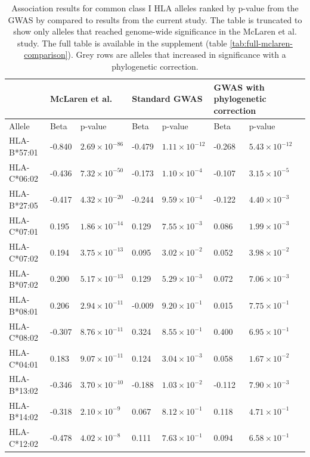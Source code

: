 \documentclass[]{article}
\begin{document}
\begin{doublespace}
\begin{table}[H]
	\begin{center}
	\begin{tabular} {p{3cm}p{1cm}p{2cm}p{1cm}p{2cm}p{1cm}p{2cm}} %
		\hline
		 & \multicolumn{2}{l}{McLaren et al.}  & \multicolumn{2}{l}{Standard GWAS } & \multicolumn{2}{l}{GWAS with phylogenetic correction} \\ 
		 \hline
		Allele & Beta & p-value & Beta & p-value & Beta & p-value \\
		\hline	
		HLA-B*57:01 & -0.840 & $2.69 \times 10^{-86}$ & -0.479 & $1.11 \times 10^{-12}$ & -0.268 & $5.43 \times 10^{-12}$ \\ 
		\rowcolor{Gray}
		HLA-C*06:02 & -0.436 & $7.32 \times 10^{-50}$ & -0.173 & $1.10 \times 10^{-4}$ & -0.107 & $3.15 \times 10^{-5}$ \\ 
		HLA-B*27:05 & -0.417 & $4.32 \times 10^{-20}$ & -0.244 & $9.59 \times 10^{-4}$ & -0.122 & $4.40 \times 10^{-3}$ \\ 
		\rowcolor{Gray}
		HLA-C*07:01 & 0.195 & $1.86 \times 10^{-14}$ & 0.129 & $7.55 \times 10^{-3}$ & 0.086 & $1.99 \times 10^{-3}$ \\ 
		HLA-C*07:02 & 0.194 & $3.75 \times 10^{-13}$ & 0.095 & $3.02 \times 10^{-2}$ & 0.052 & $3.98 \times 10^{-2}$ \\ 
		HLA-B*07:02 & 0.200 & $5.17 \times 10^{-13}$ & 0.129 & $5.29 \times 10^{-3}$ & 0.072 & $7.06 \times 10^{-3}$ \\ 
		\rowcolor{Gray}
		HLA-B*08:01 & 0.206 & $2.94 \times 10^{-11}$ & -0.009 & $9.20 \times 10^{-1}$ & 0.015 & $7.75 \times 10^{-1}$ \\ 
		\rowcolor{Gray}
		HLA-C*08:02 & -0.307 & $8.76 \times 10^{-11}$ & 0.324 & $8.55 \times 10^{-1}$ & 0.400 & $6.95 \times 10^{-1}$ \\ 
		HLA-C*04:01 & 0.183 & $9.07 \times 10^{-11}$ & 0.124 & $3.04 \times 10^{-3}$ & 0.058 & $1.67 \times 10^{-2}$ \\ 
		\rowcolor{Gray}
		HLA-B*13:02 & -0.346 & $3.70 \times 10^{-10}$ & -0.188 & $1.03 \times 10^{-2}$ & -0.112 & $7.90 \times 10^{-3}$ \\ 
		\rowcolor{Gray}
		HLA-B*14:02 & -0.318 & $2.10 \times 10^{-9}$ & 0.067 & $8.12 \times 10^{-1}$ & 0.118 & $4.71 \times 10^{-1}$ \\ 
		\rowcolor{Gray}
		HLA-C*12:02 & -0.478 & $4.02 \times 10^{-8}$ & 0.111 & $7.63 \times 10^{-1}$ & 0.094 & $6.58 \times 10^{-1}$ \\
		\hline
	\end{tabular}
	\caption{Association results for common class I HLA alleles ranked by p-value from the GWAS by \citet{McLaren2015} compared to results from the current study. The table is truncated to show only alleles that reached genome-wide significance in the McLaren et al. study. The full table is available in the supplement (table \ref{tab:full-mclaren-comparison}). Grey rows are alleles that increased in significance with a phylogenetic correction.}
	\label{tab:lim-mclaren-comparison}
	\end{center}
\end{table}




\end{doublespace}
\end{document}
